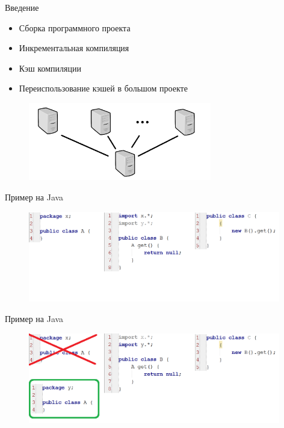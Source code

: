 

% 




{
	\begin{frame}
		\titlepage
	\end{frame}
}
\addtocounter{framenumber}{-1}

\begin{frame}{Введение}
\begin{itemize}
	\item Сборка программного проекта
	\item Инкрементальная компиляция
	\item Кэш компиляции
	\item Переиспользование кэшей в большом проекте
\end{itemize}
\begin{figure}[!h]
	\begin{center}
		\includegraphics[width=80mm]{network.png}
	\end{center}
\end{figure}
\end{frame}

\begin{frame}{Пример на Java}
\begin{figure}[!h]
	\centering
	\includegraphics[width=110mm]{state1.png}
\end{figure}
\end{frame}

\begin{frame}{Пример на Java}
\begin{figure}[!h]
	\centering
	\includegraphics[width=110mm]{state2.png}
\end{figure}
\end{frame}

